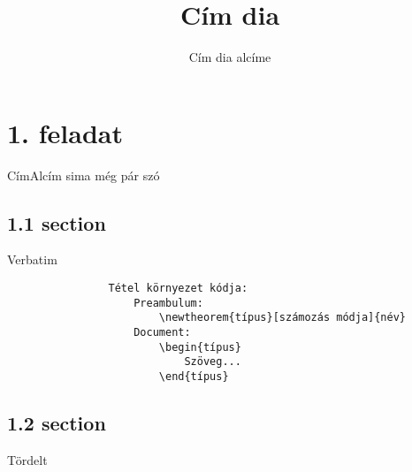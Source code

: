 \documentclass[aspectratio=169, bigger, xcolor=table]{beamer}
\begin{document}
    \AtBeginSection{\begin{frame}
            \sectionpage
        \end{frame}
        \begin{frame}
    \tableofcontents[currentsection]
\end{frame}}

    \begin{frame}
            \title{Cím dia}
            \subtitle{Cím dia alcíme}
            
            \maketitle
    \end{frame}
    
    \section{1. feladat}
    
        
        \begin{frame}{Cím}{Alcím}
            sima
            \newline
            még pár szó
        \end{frame}
        
        \subsection{1.1 section}
        \begin{frame}[fragile]{Verbatim}
            \begin{verbatim}
                Tétel környezet kódja:
                    Preambulum:
                        \newtheorem{típus}[számozás módja]{név}
                    Document:
                        \begin{típus}
                            Szöveg...
                        \end{típus}
            \end{verbatim}
        \end{frame}
        
        \subsection{1.2 section}
        \begin{frame}[allowframebreaks]{Tördelt}
            \lipsum[2-5]
        \end{frame}
    
\end{document}
